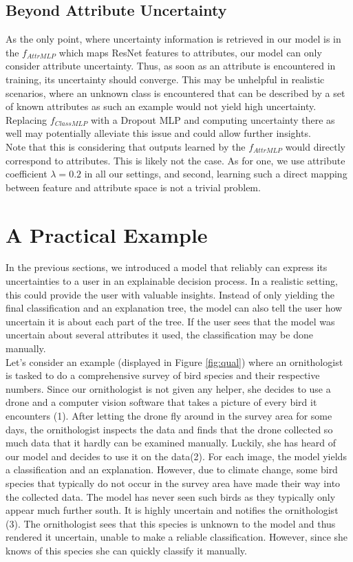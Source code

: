 \documentclass[a4paper,cleardoubleempty,BCOR1cm, 11pt]{report}
\begin{document}
\subsection{Beyond Attribute Uncertainty}\label{sec:attr_uncertainty}
As the only point, where uncertainty information is retrieved in our model is in the $f_{AttrMLP}$ which maps ResNet features to attributes, our model can only consider attribute uncertainty. Thus, as soon as an attribute is encountered in training, its uncertainty should converge. This may be unhelpful in realistic scenarios, where an unknown class is encountered that can be described by a set of known attributes as such an example would not yield high uncertainty. Replacing $f_{ClassMLP}$ with a Dropout MLP and computing uncertainty there as well may potentially alleviate this issue and could allow further insights.\\
Note that this is considering that outputs learned by the $f_{AttrMLP}$ would directly correspond to attributes. This is likely not the case. As for one, we use attribute coefficient $\lambda=0.2$ in all our settings, and second, learning such a direct mapping between feature and attribute space is not a trivial problem. %




\section{A Practical Example}
In the previous sections, we introduced a model that reliably can express its uncertainties to a user in an explainable decision process. In a realistic setting, this could provide the user with valuable insights. Instead of only yielding the final classification and an explanation tree, the model can also tell the user how uncertain it is about each part of the tree. If the user sees that the model was uncertain about several attributes it used, the classification may be done manually.\\
Let's consider an example (displayed in Figure \ref{fig:qual}) where an ornithologist is tasked to do a comprehensive survey of bird species and their respective numbers. Since our ornithologist is not given any helper, she decides to use a drone and a computer vision software that takes a picture of every bird it encounters (1). After letting the drone fly around in the survey area for some days, the ornithologist inspects the data and finds that the drone collected so much data that it hardly can be examined manually. Luckily, she has heard of our model and decides to use it on the data(2). For each image, the model yields a classification and an explanation. However, due to climate change, some bird species that typically do not occur in the survey area have made their way into the collected data. The model has never seen such birds as they typically only appear much further south. It is highly uncertain and notifies the ornithologist (3). The ornithologist sees that this species is unknown to the model and thus rendered it uncertain, unable to make a reliable classification. However, since she knows of this species she can quickly classify it manually.
\end{document}
